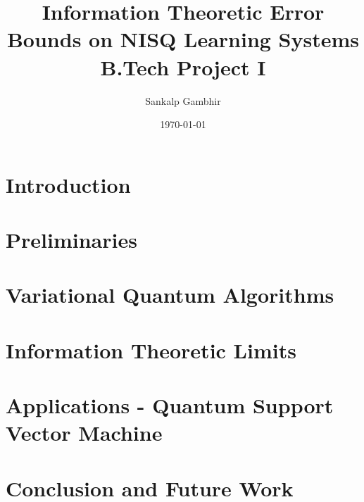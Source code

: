 \documentclass[
    paper=a4, 
    lang=en, 
    font=kpfonts, 
    ptsize=12pt,
    titles=rm,
    hanging-titles=true,
    final
]
{skrapport}
\title{
    {\huge Information Theoretic Error Bounds on NISQ Learning Systems} \\
    {\large B.Tech Project I}
    }
\author[sgambhir@iitb.ac.in]{Sankalp Gambhir}
\date{\today}
\begin{document}
    \begin{titlepage}
        \maketitle
        \begin{abstract}
            \lipsum[1]
        \end{abstract}        
    \end{titlepage}

    \tableofcontents \pagebreak

    \section{Introduction}
        \label{sec:intro}
        
    
    \section{Preliminaries}
        \label{sec:prelim}
        

    \section{Variational Quantum Algorithms}
        \label{sec:vqa}
        
    
    \section{Information Theoretic Limits}
        \label{sec:infolimits}
        

    \section{Applications - Quantum Support Vector Machine}
        \label{sec:qsvm}
        

    \section{Conclusion and Future Work}
        \label{sec:future}
        

    \printbibliography
\end{document}
